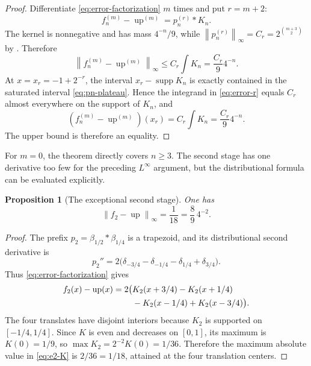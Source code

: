 \documentclass[11pt,oneside]{article}
\newtheorem{proposition}[theorem]{Proposition}
\theoremstyle{definition}
\theoremstyle{remark}
\newcommand{\Up}{\operatorname{up}}
\newcommand{\supp}{\operatorname{supp}}
\newcommand{\norm}[1]{\left\lVert #1\right\rVert}
\begin{document}
\begin{proof}
Differentiate \eqref{eq:error-factorization} $m$ times and put $r=m+2$:
\begin{equation}
 f_n^{(m)}-\Up^{(m)}=p_n^{(r)}*K_n.                        \label{eq:error-r}
\end{equation}
The kernel is nonnegative and has mass $4^{-n}/9$, while
$\norm{p_n^{(r)}}_\infty=C_r=2^{\binom{m+3}{2}}$ by
.  Therefore
\[
 \norm{f_n^{(m)}-\Up^{(m)}}_\infty
 \le C_r\int K_n
 =\frac{C_r}{9}4^{-n}.
\]
At $x=x_r=-1+2^{-r}$, the interval $x_r-\supp K_n$ is exactly contained in the saturated
interval \eqref{eq:pn-plateau}.  Hence the integrand in \eqref{eq:error-r} equals $C_r$ almost
everywhere on the support of $K_n$, and
\[
 (f_n^{(m)}-\Up^{(m)})(x_r)=C_r\int K_n=\frac{C_r}{9}4^{-n}.
\]
The upper bound is therefore an equality.
\end{proof}

For $m=0$, the theorem directly covers $n\ge3$.  The second stage has one derivative too few
for the preceding $L^\infty$ argument, but the distributional formula can be evaluated
explicitly.

\begin{proposition}[The exceptional second stage]
\label{prop:n2-error}
One has
\begin{equation}
 \norm{f_2-\Up}_\infty=\frac1{18}=\frac89\,4^{-2}.         \label{eq:n2-error}
\end{equation}
\end{proposition}

\begin{proof}
The prefix $p_2=\beta_{1/2}*\beta_{1/4}$ is a trapezoid, and its distributional second
derivative is
\begin{equation}
 p_2''=2\bigl(\delta_{-3/4}-\delta_{-1/4}-\delta_{1/4}+\delta_{3/4}\bigr).    \label{eq:p2-second}
\end{equation}
Thus \eqref{eq:error-factorization} gives
\begin{align}
 f_2(x)-\Up(x)=2\bigl(&K_2(x+3/4)-K_2(x+1/4)\notag\\
                     &-K_2(x-1/4)+K_2(x-3/4)\bigr).        \label{eq:e2-K}
\end{align}
The four translates have disjoint interiors because $K_2$ is supported on $[-1/4,1/4]$.
Since $K$ is even and decreases on $[0,1]$, its maximum is $K(0)=1/9$, so
$\max K_2=2^{-2}K(0)=1/36$.  Therefore the maximum absolute value in \eqref{eq:e2-K} is
$2/36=1/18$, attained at the four translation centers.
\end{proof}
\end{document}
